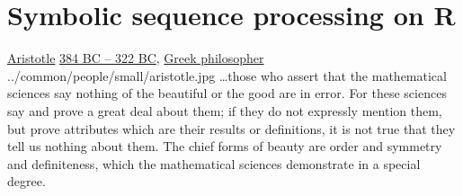 \chapter{Symbolic sequence processing on R\raisebox{0.65ex}{N}}\label{chp:ssp}
\qboxnps
  {\href{http://en.wikipedia.org/wiki/Aristotle}{Aristotle}
   \href{http://www-history.mcs.st-andrews.ac.uk/Timelines/TimelineA.html}{384 BC -- 322 BC},
   \href{http://www-history.mcs.st-andrews.ac.uk/BirthplaceMaps/Places/Greece.html}{Greek philosopher}
   \footnotemark
  }
  {../common/people/small/aristotle.jpg}
  {\ldots those who assert that the mathematical sciences
     say nothing of the beautiful or the good are in error.
     For these sciences say and prove a great deal about them;
     if they do not expressly mention them, but prove attributes
     which are their results or definitions, it is not true that they tell
     us nothing about them.
     The chief forms of beauty are order and symmetry and definiteness,
     which the mathematical sciences demonstrate in a special degree.}

